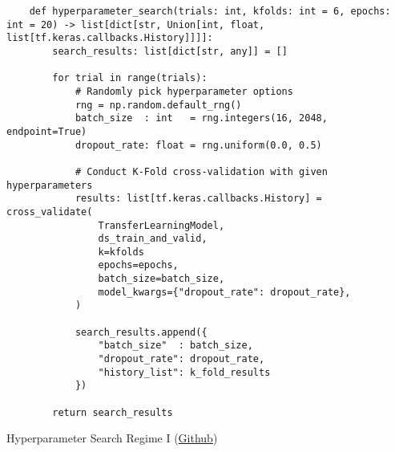 \begin{listing}[H]
    \begin{verbatim}
    def hyperparameter_search(trials: int, kfolds: int = 6, epochs: int = 20) -> list[dict[str, Union[int, float, list[tf.keras.callbacks.History]]]]:
        search_results: list[dict[str, any]] = []

        for trial in range(trials):
            # Randomly pick hyperparameter options
            rng = np.random.default_rng()
            batch_size  : int   = rng.integers(16, 2048, endpoint=True)
            dropout_rate: float = rng.uniform(0.0, 0.5)

            # Conduct K-Fold cross-validation with given hyperparameters
            results: list[tf.keras.callbacks.History] = cross_validate(
                TransferLearningModel,
                ds_train_and_valid,
                k=kfolds
                epochs=epochs,
                batch_size=batch_size,
                model_kwargs={"dropout_rate": dropout_rate},
            )

            search_results.append({
                "batch_size"  : batch_size,
                "dropout_rate": dropout_rate,
                "history_list": k_fold_results
            })

        return search_results
    \end{verbatim}
\caption{Hyperparameter Search Regime I (\href{https://github.com/ShenZhouHong/radiography-ai-project/blob/master/python/hyperparam-search/regime-1.ipynb}{Github})}\label{listing:regime-1}
\end{listing}